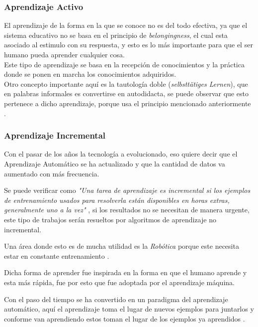         \subsubsection{Aprendizaje Activo}
        	
        	
            El aprendizaje de la forma en la que se conoce no es del todo efectiva, ya que el sistema educativo
            no se basa en el principio de \textit{belongingness}, el cual esta asociado al estimulo con su respuesta,
            y esto es lo m\'as importante para que el ser humano pueda aprender cualquier cosa.\\
            
            Este tipo de aprendizaje se basa en la recepci\'on de conocimientos y la pr\'actica donde se ponen en marcha los conocimientos adquiridos.\\
            Otro concepto importante aqu\'i es la tautolog\'ia doble (\textit{selbstt\"atiges Lernen}), que en palabras informales es convertirse en autodidacta, 
            se puede observar que esto pertenece a dicho aprendizaje, porque usa el principio mencionado anteriormente \cite{Huber2008}.

 \subsubsection{Aprendizaje Incremental}
 	
 	
 	Con el pasar de los años la tecnología a evolucionado, eso quiere decir que el Aprendizaje Automático se ha actualizado y que la 
        cantidad de datos va aumentado con más frecuencia.
        
        Se puede verificar como \textit{"Una tarea de aprendizaje es incremental si los ejemplos de entrenamiento usados para 
        resolverla están disponibles en horas extras, generalmente uno a la vez"} \cite{GiraudCarrier2000}, si los resultados no se 
        necesitan de manera urgente, este tipo de trabajos serán resueltos por algoritmos de aprendizaje no incremental. 

        Una área donde esto es de mucha utilidad es la \textit{Rob\'otica} porque este necesita estar en constante entrenamiento \cite{GiraudCarrier2000}.

        Dicha forma de aprender fue inspirada en la forma en que el humano aprende y esta más rápida, fue por esto que fue adoptada 
        por el aprendizaje m\'aquina.

        Con el paso del tiempo se ha convertido en un paradigma del aprendizaje automático, aquí el aprendizaje toma el lugar de nuevos ejemplos para juntarlos 
        y conforme van aprendiendo estos toman el lugar de los ejemplos ya aprendidos \cite{liu2015}.

